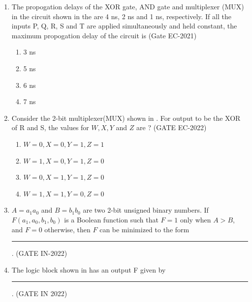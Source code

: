 \begin{enumerate}[label=\arabic*.,ref=\theenumi]
\begin{karnaugh-map}[4][4][1][$PQ$][$RS$]

	\end{karnaugh-map}
\item The propogation delays of the XOR gate, AND gate and multiplexer (MUX) in the circuit shown in the 
	are 4 ns, 2 ns and 1 ns, respectively.
\label{prob:2021-gate-ec-31}
If all the inputs P, Q, R, S and T are applied simultaneously and held constant, the maximum propogation delay of the circuit is
\hfill (Gate EC-2021)
\begin{enumerate}
	\item 3 ns \item 5 ns \item 6 ns \item 7 ns
\end{enumerate}
\begin{figure}[!ht]
	\centering
	\resizebox{\columnwidth}{!}{%

	}
	\caption{}
\label{fig:2021-gate-ec-31}
\end{figure}
\item 
\label{prob:2012-gate-ec-19}
Consider the 2-bit multiplexer(MUX) shown in 
.
 For output to be the XOR of R and S, the values for $ W,X,Y$ and $Z$ are ? 
\hfill (GATE EC-2022)
\begin{figure}[!ht]

\caption{}
\label{fig:2012-gate-ec-19}
\end{figure}
\begin{enumerate}
\item $W = 0, X = 0, Y = 1, Z = 1$
\item $W = 1, X = 0, Y = 1, Z = 0$
\item $W = 0, X = 1, Y = 1, Z = 0$
\item $W = 1, X = 1, Y = 0, Z = 0$
\end{enumerate}
\item $A=a_1a_0$ and $B=b_1b_0$ are two 2-bit unsigned binary numbers. If $F(a_1,a_0,b_1,b_0)$ is a Boolean function such that $F = 1$ only when $A>B$, and $F=0$ otherwise, then $F$ can be minimized to the form \rule{9mm}{0.4pt}.
\hfill(GATE IN-2022)
\label{prob:2022-gate-in-48}
\item 
	\label{prob:2022/gate/in/21}
	The logic block shown in
	has an output F given by \rule{10mm}{0.4pt}.	
		\hfill(GATE IN 2022)
	\begin{figure}[!ht]

\end{figure}
\end{enumerate}
